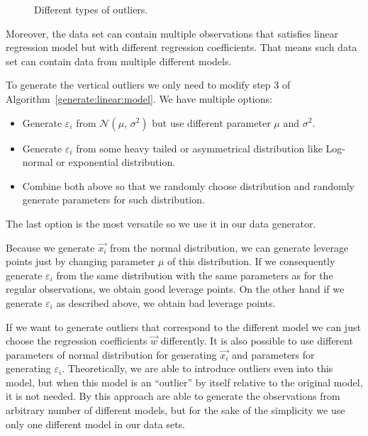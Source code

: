 \begin{figure}[h]

    \caption{Different types of outliers.  }
    \label{outliers:types:figure}
\end{figure}

Moreover, the data set can contain multiple observations that satisfies linear regression model but with different regression coefficients. That means such data set can contain data from multiple different models.

To generate the vertical outliers we only need to modify step $3$ of Algorithm~\ref{generate:linear:model}. We have multiple options:
\begin{itemize}
    \item Generate $\varepsilon_i$ from $\mathcal{N}(\mu,\,\sigma^{2})$ but use different parameter  $\mu$ and $\sigma^{2}$.
    \item Generate $\varepsilon_i$ from some heavy tailed or asymmetrical distribution like  Log-normal or exponential distribution.
    \item Combine both above so that we randomly choose distribution and randomly generate parameters for such distribution.
\end{itemize}
The last option is the most versatile so we use it in our data generator.

Because we generate $\vec{x_i}$ from the normal distribution, we can generate leverage points just by changing parameter $\mu$  of this distribution. If we consequently generate $\varepsilon_i$ from the same distribution with the same parameters as for the regular observations, we obtain good leverage points. On the other hand if we generate $\varepsilon_i$ as described above, we obtain bad leverage points.

If we want to generate outliers that correspond to the different model we can just choose the regression coefficients $\vec{w}$ differently. It is also possible to use different parameters of normal distribution for generating $\vec{x_i}$ and parameters for generating $\varepsilon_i$. Theoretically, we are able to introduce outliers even into this model, but when this model is an ``outlier'' by itself relative to the original model, it is not needed. By this approach are able to generate the observations from arbitrary number of different models, but for the sake of the simplicity we use only one different model in our data sets.

